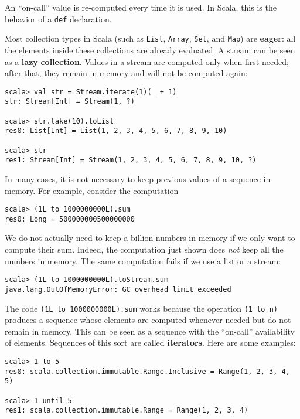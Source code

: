 An ``on-call'' value is re-computed every time it is used. In Scala,
this is the behavior of a \lstinline!def!
declaration.

Most collection types in Scala (such as \lstinline!List!,
\lstinline!Array!, \lstinline!Set!,
and \lstinline!Map!) are
\textbf{eager}: all the elements inside these
collections are already evaluated. A stream can be seen as a \textbf{lazy}
\textbf{collection}. Values in a stream are computed only when first
needed; after that, they remain in memory and will not be computed
again:
\begin{lstlisting}
scala> val str = Stream.iterate(1)(_ + 1)
str: Stream[Int] = Stream(1, ?)

scala> str.take(10).toList
res0: List[Int] = List(1, 2, 3, 4, 5, 6, 7, 8, 9, 10)

scala> str
res1: Stream[Int] = Stream(1, 2, 3, 4, 5, 6, 7, 8, 9, 10, ?)
\end{lstlisting}
In many cases, it is not necessary to keep previous values of a sequence
in memory. For example, consider the computation
\begin{lstlisting}
scala> (1L to 1000000000L).sum
res0: Long = 500000000500000000
\end{lstlisting}
We do not actually need to keep a billion numbers in memory if we
only want to compute their sum. Indeed, the computation just shown
does \emph{not} keep all the numbers in memory. The same computation
fails if we use a list or a stream:
\begin{lstlisting}
scala> (1L to 1000000000L).toStream.sum
java.lang.OutOfMemoryError: GC overhead limit exceeded
\end{lstlisting}
The code \lstinline!(1L to 1000000000L).sum!
works because the operation \lstinline!(1 to n)!
produces a sequence whose elements are computed whenever needed but
do not remain in memory. This can be seen as a sequence with the ``on-call''
availability of elements. Sequences of this sort are called \textbf{iterators}.
Here are some examples:
\begin{lstlisting}
scala> 1 to 5
res0: scala.collection.immutable.Range.Inclusive = Range(1, 2, 3, 4, 5)

scala> 1 until 5
res1: scala.collection.immutable.Range = Range(1, 2, 3, 4)
\end{lstlisting}

